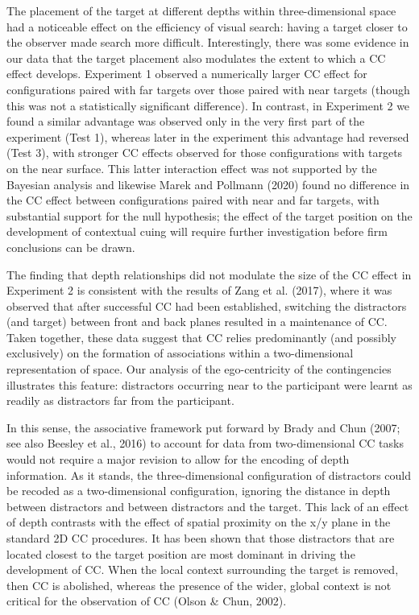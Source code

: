 \documentclass[
  man,floatsintext]{apa7}
\begin{document}
The placement of the target at different depths within three-dimensional space had a noticeable effect on the efficiency of visual search: having a target closer to the observer made search more difficult. Interestingly, there was some evidence in our data that the target placement also modulates the extent to which a CC effect develops. Experiment 1 observed a numerically larger CC effect for configurations paired with far targets over those paired with near targets (though this was not a statistically significant difference). In contrast, in Experiment 2 we found a similar advantage was observed only in the very first part of the experiment (Test 1), whereas later in the experiment this advantage had reversed (Test 3), with stronger CC effects observed for those configurations with targets on the near surface. This latter interaction effect was not supported by the Bayesian analysis and likewise Marek and Pollmann (2020) found no difference in the CC effect between configurations paired with near and far targets, with substantial support for the null hypothesis; the effect of the target position on the development of contextual cuing will require further investigation before firm conclusions can be drawn.

The finding that depth relationships did not modulate the size of the CC effect in Experiment 2 is consistent with the results of Zang et al. (2017), where it was observed that after successful CC had been established, switching the distractors (and target) between front and back planes resulted in a maintenance of CC. Taken together, these data suggest that CC relies predominantly (and possibly exclusively) on the formation of associations within a two-dimensional representation of space. Our analysis of the ego-centricity of the contingencies illustrates this feature: distractors occurring near to the participant were learnt as readily as distractors far from the participant.

In this sense, the associative framework put forward by Brady and Chun (2007; see also Beesley et al., 2016) to account for data from two-dimensional CC tasks would not require a major revision to allow for the encoding of depth information. As it stands, the three-dimensional configuration of distractors could be recoded as a two-dimensional configuration, ignoring the distance in depth between distractors and between distractors and the target. This lack of an effect of depth contrasts with the effect of spatial proximity on the x/y plane in the standard 2D CC procedures. It has been shown that those distractors that are located closest to the target position are most dominant in driving the development of CC. When the local context surrounding the target is removed, then CC is abolished, whereas the presence of the wider, global context is not critical for the observation of CC (Olson \& Chun, 2002).
\end{document}
